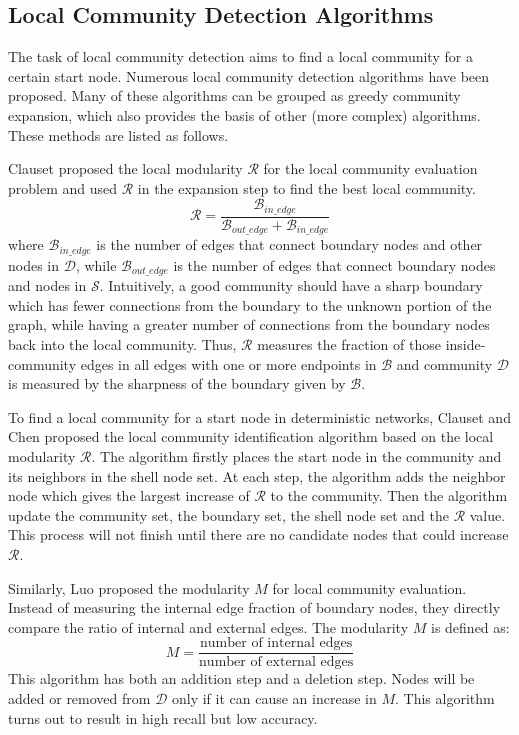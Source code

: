 \documentclass[\main/thesis.tex]{subfiles}
\begin{document}
\subsection{Local Community Detection Algorithms} \label{Local-Community-Detection-Algorithms-Review}
The task of local community detection aims to find a local community for a certain start node. Numerous local community detection algorithms have been proposed. Many of these algorithms can be grouped as greedy community expansion, which also provides the basis of other (more complex) algorithms. These methods are listed as follows.

Clauset \cite{clauset2005finding} proposed the local modularity $\mathcal{R}$ for the local community evaluation problem and used $\mathcal{R}$ in the expansion step to find the best local community.
\begin{equation}
\mathcal{R} = \frac{\mathcal{B}_{in\_edge}}{\mathcal{B}_{out\_edge}+\mathcal{B}_{in\_edge}}
\end{equation}
where $\mathcal{B}_{in\_edge}$ is the number of edges that connect boundary nodes and other nodes in $\mathcal{D}$, while $\mathcal{B}_{out\_edge}$ is the number of edges that connect boundary nodes and nodes in $\mathcal{S}$. Intuitively, a good community should have a sharp boundary which has fewer connections from the boundary to the unknown portion of the graph, while having a greater number of connections from the boundary nodes back into the local community. Thus, $\mathcal{R}$ measures the fraction of those inside-community edges in all edges with one or more endpoints in $\mathcal{B}$ and community $\mathcal{D}$ is measured by the sharpness of the boundary given by $\mathcal{B}$.

To find a local community for a start node in deterministic networks, Clauset \cite{clauset2005finding} and Chen \cite{chen2009detecting} proposed the local community identification algorithm based on the local modularity $\mathcal{R}$. The algorithm firstly places the start node in the community and its neighbors in the shell node set. At each step, the algorithm adds the neighbor node which gives the largest increase of $\mathcal{R}$ to the community. Then the algorithm update the community set, the boundary set, the shell node set and the $\mathcal{R}$ value. This process will not finish until there are no candidate nodes that could increase $\mathcal{R}$.

Similarly, Luo \cite{luo2008exploring} proposed the modularity $M$ for local community evaluation. Instead of measuring the internal edge fraction of boundary nodes, they directly compare the ratio of internal and external edges. The modularity $M$ is defined as:
\begin{equation}
M = \frac{\text{number of internal edges}}{\text{number of external edges}}
\end{equation}
This algorithm has both an addition step and a deletion step. Nodes will be added or removed from $\mathcal{D}$ only if it can cause an increase in $M$. This algorithm turns out to result in high recall but low accuracy.
\end{document}
